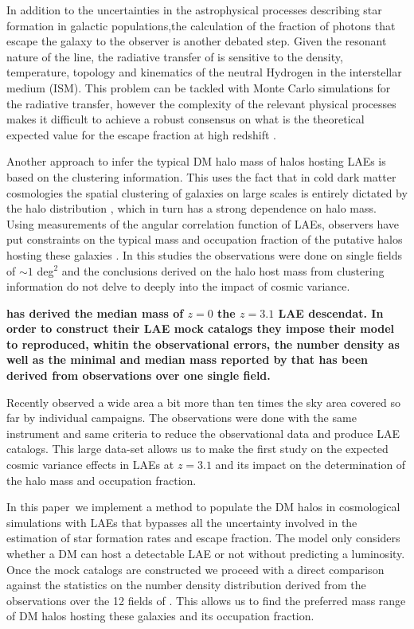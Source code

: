 \documentclass[usenatbib]{mn2e}
\newcommand{\documentname}{paper~}
\newcommand{\ly}{{\ifmmode{{\rm Ly}\alpha}\else{Ly$\alpha$~}\fi}}
\begin{document}
In addition to the uncertainties in the astrophysical processes
describing star formation in galactic populations,the calculation
of the fraction of \ly photons that escape the galaxy to the observer
is another debated step. Given the resonant nature of the \ly line,
the radiative transfer of \ly is sensitive to the density,
temperature, topology and kinematics of the neutral Hydrogen in the
interstellar medium
(ISM). This problem can be tackled with Monte Carlo simulations for the
radiative transfer, however the complexity of the relevant physical
processes makes it difficult to achieve a robust consensus on what is
the theoretical expected value for the \ly escape fraction
at high redshift
\citep{Neufeld1991,Verhamme2006,ForeroRomero2011,Dijkstra2012,Laursen2013,Orsi2012}. 

Another approach to infer the typical DM halo mass of halos hosting
LAEs is based on the clustering information. This uses the fact that in cold
dark matter cosmologies the spatial clustering of galaxies on large
scales is entirely dictated by the halo distribution
\citep{Colberg00}, which in turn has a strong dependence on halo
mass. Using measurements of the angular correlation function of LAEs,
observers have put constraints on the typical mass and occupation
fraction of the putative halos hosting these galaxies
\citep{Hayashino2004,Gawiser07,Nilsson2007,Ouchi2010}. In this
studies the observations were done on single fields of $\sim 1$
deg$^{2}$ and the conclusions derived on the halo host mass from
clustering information do not delve to deeply into the impact of
cosmic variance.  

{\bf \cite{Soler2012} has derived the median mass of $z=0$ the $z=3.1$ LAE 
descendat.  In order to construct their  LAE mock catalogs 
they impose their model to reproduced, whitin the observational errors,
 the number density  as well as  the minimal and median mass reported 
 by \cite{Gawiser07} that has been derived from observations
 over one single field. }

Recently \cite{Yamada2012} observed a wide area a bit more than ten
times the sky area covered so far by individual campaigns. The
observations were done with the same instrument and same criteria to
reduce the observational data and produce LAE catalogs. This large
data-set allows us to make the first study on the expected cosmic
variance effects in LAEs at $z=3.1$ and its impact on the
determination of the halo mass and occupation fraction. 


In this \documentname we implement a method to populate the DM halos
in cosmological simulations with LAEs that bypasses all the
uncertainty involved in the estimation of star formation rates and \ly escape
fraction. The model only considers whether a DM can host a
detectable LAE or not without predicting a \ly  luminosity. Once the
mock catalogs are constructed  we proceed with a direct comparison
against the statistics on the number density distribution derived from
 the observations over the 12 fields of \cite{Yamada2012}. This allows us 
to find the preferred mass range of DM halos hosting these galaxies
and its occupation fraction.
\end{document}
